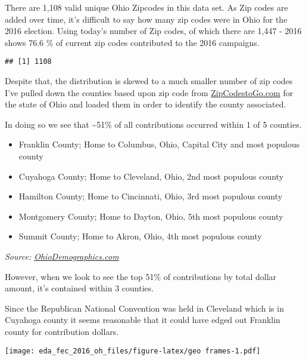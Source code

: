 \documentclass[]{article}
\providecommand{\tightlist}{%
  \setlength{\itemsep}{0pt}\setlength{\parskip}{0pt}}
\begin{document}
There are 1,108 valid unique Ohio Zipcodes in this data set. As Zip
codes are added over time, it's difficult to say how many zip codes were
in Ohio for the 2016 election. Using today's number of Zip codes, of
which there are 1,447 - 2016 shows 76.6 \% of current zip codes
contributed to the 2016 campaigns.

\begin{verbatim}
## [1] 1108
\end{verbatim}

Despite that, the distribution is skewed to a much smaller number of zip
codes I've pulled down the counties based upon zip code from
\href{https://www.zipcodestogo.com/Ohio/}{ZipCodestoGo.com} for the
state of Ohio and loaded them in order to identify the county
associated.

In doing so we see that \textasciitilde51\% of all contributions
occurred within 1 of 5 counties.

\begin{itemize}
\tightlist
\item
  Franklin County; Home to Columbus, Ohio, Capital City and most
  populous county
\item
  Cuyahoga County; Home to Cleveland, Ohio, 2nd most populous county
\item
  Hamilton County; Home to Cincinnati, Ohio, 3rd most populous county
\item
  Montgomery County; Home to Dayton, Ohio, 5th most populous county
\item
  Summit County; Home to Akron, Ohio, 4th most populous county
\end{itemize}

\emph{Source:
\href{https://www.ohio-demographics.com/counties_by_population}{OhioDemographics.com}}

However, when we look to see the top 51\% of contributions by total
dollar amount, it's contained within 3 counties.

Since the Republican National Convention was held in Cleveland which is
in Cuyahoga county it seems reasonable that it could have edged out
Franklin county for contribution dollars.

\texttt{[image: eda\_fec\_2016\_oh\_files/figure-latex/geo frames-1.pdf]}
\end{document}
